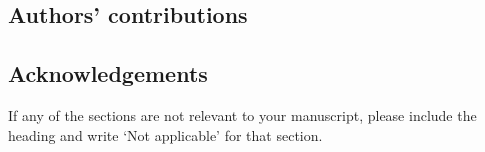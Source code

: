 \documentclass[sn-nature]{sn-jnl}%
\begin{document}
\subsection*{Authors' contributions}

\subsection*{Acknowledgements}


\noindent
If any of the sections are not relevant to your manuscript, please include the heading and write `Not applicable' for that section. 





\end{document}
